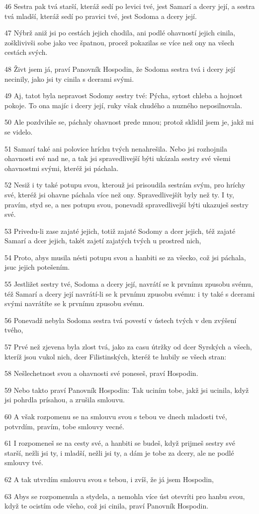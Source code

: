 \par 46 Sestra pak tvá starší, kteráž sedí po levici tvé, jest Samarí a dcery její, a sestra tvá mladší, kteráž sedí po pravici tvé, jest Sodoma a dcery její.
\par 47 Nýbrž aniž jsi po cestách jejich chodila, ani podlé ohavností jejich cinila, zošklivivši sobe jako vec špatnou, procež pokazilas se více než ony na všech cestách svých.
\par 48 Živt jsem já, praví Panovník Hospodin, že Sodoma sestra tvá i dcery její necinily, jako jsi ty cinila s dcerami svými.
\par 49 Aj, tatot byla nepravost Sodomy sestry tvé: Pýcha, sytost chleba a hojnost pokoje. To ona majíc i dcery její, ruky však chudého a nuzného neposilnovala.
\par 50 Ale pozdvihše se, páchaly ohavnost prede mnou; protož sklidil jsem je, jakž mi se videlo.
\par 51 Samarí také ani polovice hríchu tvých nenahrešila. Nebo jsi rozhojnila ohavnosti své nad ne, a tak jsi spravedlivejší býti ukázala sestry své všemi ohavnostmi svými, kteréž jsi páchala.
\par 52 Nesiž i ty také potupu svou, kterouž jsi prisoudila sestrám svým, pro hríchy své, kteréž jsi ohavne páchala více než ony. Spravedlivejšít byly než ty. I ty, pravím, styd se, a nes potupu svou, ponevadž spravedlivejší býti ukazuješ sestry své.
\par 53 Privedu-li zase zajaté jejich, totiž zajaté Sodomy a dcer jejich, též zajaté Samarí a dcer jejich, takét zajetí zajatých tvých u prostred nich,
\par 54 Proto, abys musila nésti potupu svou a hanbiti se za všecko, což jsi páchala, jsuc jejich potešením.
\par 55 Jestližet sestry tvé, Sodoma a dcery její, navrátí se k prvnímu zpusobu svému, též Samarí a dcery její navrátí-li se k prvnímu zpusobu svému: i ty také s dcerami svými navrátíte se k prvnímu zpusobu svému.
\par 56 Ponevadž nebyla Sodoma sestra tvá povestí v ústech tvých v den zvýšení tvého,
\par 57 Prvé než zjevena byla zlost tvá, jako za casu útržky od dcer Syrských a všech, kteríž jsou vukol nich, dcer Filistinských, kteréž te hubily se všech stran:
\par 58 Nešlechetnost svou a ohavnosti své poneseš, praví Hospodin.
\par 59 Nebo takto praví Panovník Hospodin: Tak uciním tobe, jakž jsi ucinila, když jsi pohrdla prísahou, a zrušila smlouvu.
\par 60 A však rozpomenu se na smlouvu svou s tebou ve dnech mladosti tvé, potvrdím, pravím, tobe smlouvy vecné.
\par 61 I rozpomeneš se na cesty své, a hanbiti se budeš, když prijmeš sestry své starší, nežli jsi ty, i mladší, nežli jsi ty, a dám je tobe za dcery, ale ne podlé smlouvy tvé.
\par 62 A tak utvrdím smlouvu svou s tebou, i zvíš, že já jsem Hospodin,
\par 63 Abys se rozpomenula a stydela, a nemohla více úst otevríti pro hanbu svou, když te ocistím ode všeho, což jsi cinila, praví Panovník Hospodin.

